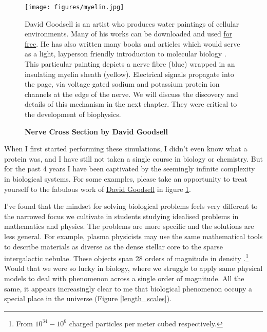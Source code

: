 \begin{figure}[h]
	\begin{center}
		\texttt{[image: figures/myelin.jpg]}
	\end{center}
	\captionsetup{singlelinecheck = false, justification=raggedright}
	\caption[Nerve Cross Section by David Goodsell] {\textbf{Nerve Cross Section by David Goodsell}}{David Goodsell is an artist who produces water paintings of cellular environments. Many of his works can be downloaded and used \href{https://pdb101.rcsb.org/sci-art/goodsell-gallery}{for free}. He has also written many books and articles which would serve as a light, layperson friendly introduction to molecular biology \cite{goodsell2009, goodsell2018, goodsell2020}. This particular painting depicts a nerve fibre (blue) wrapped in an insulating myelin sheath (yellow). Electrical signals propagate into the page, via voltage gated sodium and potassium protein ion channels at the edge of the nerve\cite{goodsell_nerve}. We will discuss the discovery and details of this mechanism in the next chapter. They were critical to the development of biophysics.}
	\label{goodsell_figure}
\end{figure}

When I first started performing these simulations, I didn't even know what a protein was, and I have still not taken a single course in biology or chemistry. But for the past 4 years I have been captivated by the seemingly infinite complexity in biological systems. For some examples, please take an opportunity to treat yourself to the fabulous work of \href {https://pdb101.rcsb.org/sci-art/goodsell-gallery}{David Goodsell} in figure \ref{goodsell_figure}. 

I've found that the mindset for solving biological problems feels very different to the narrowed focus we cultivate in students studying idealised problems in mathematics and physics. The problems are more specific and the solutions are less general. For example, plasma physicists may use the same mathematical tools to describe materials as diverse as the dense stellar core to the sparse intergalactic nebulae. These objects span 28 orders of magnitude in density \cite{chen2018}.\footnote{From $10^{34}-10^6$ charged particles per meter cubed respectively.} Would that we were so lucky in biology, where we struggle to apply same physical models to deal with phenomenon across a single order of magnitude. All the same, it appears increasingly clear to me that biological phenomenon occupy a special place in the universe (Figure \ref{length_scales}). 


